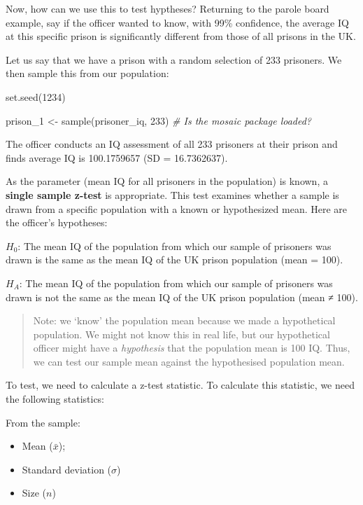 \documentclass[
]{book}
\newenvironment{Shaded}{\begin{snugshade}}{\end{snugshade}}
\newcommand{\CommentTok}[1]{\textcolor[rgb]{0.56,0.35,0.01}{\textit{#1}}}
\newcommand{\DecValTok}[1]{\textcolor[rgb]{0.00,0.00,0.81}{#1}}
\newcommand{\FunctionTok}[1]{\textcolor[rgb]{0.00,0.00,0.00}{#1}}
\newcommand{\NormalTok}[1]{#1}
\newcommand{\OtherTok}[1]{\textcolor[rgb]{0.56,0.35,0.01}{#1}}
\providecommand{\tightlist}{%
  \setlength{\itemsep}{0pt}\setlength{\parskip}{0pt}}
\begin{document}
Now, how can we use this to test hyptheses? Returning to the parole board example, say if the officer wanted to know, with 99\% confidence, the average IQ at this specific prison is significantly different from those of all prisons in the UK.

Let us say that we have a prison with a random selection of 233 prisoners. We then sample this from our population:

\begin{Shaded}
\begin{Highlighting}[]
\FunctionTok{set.seed}\NormalTok{(}\DecValTok{1234}\NormalTok{)}

\NormalTok{prison\_1 }\OtherTok{\textless{}{-}} \FunctionTok{sample}\NormalTok{(prisoner\_iq, }\DecValTok{233}\NormalTok{) }\CommentTok{\# Is the \textquotesingle{}mosaic\textquotesingle{} package loaded?}
\end{Highlighting}
\end{Shaded}

The officer conducts an IQ assessment of all 233 prisoners at their prison and finds average IQ is 100.1759657 (SD = 16.7362637).

As the parameter (mean IQ for all prisoners in the population) is known, a \textbf{single sample z-test} is appropriate. This test examines whether a sample is drawn from a specific population with a known or hypothesized mean. Here are the officer's hypotheses:

\(H_0\): The mean IQ of the population from which our sample of prisoners was drawn is the same as the mean IQ of the UK prison population (mean = 100).

\(H_A\): The mean IQ of the population from which our sample of prisoners was drawn is not the same as the mean IQ of the UK prison population (mean ≠ 100).

\begin{quote}
Note: we `know' the population mean because we made a hypothetical population. We might not know this in real life, but our hypothetical officer might have a \emph{hypothesis} that the population mean is 100 IQ. Thus, we can test our sample mean against the hypothesised population mean.
\end{quote}

To test, we need to calculate a z-test statistic. To calculate this statistic, we need the following statistics:

From the sample:

\begin{itemize}
\tightlist
\item
  Mean (\(\bar{x}\));
\item
  Standard deviation (\(\sigma\))
\item
  Size (\(n\))
\end{itemize}
\end{document}
